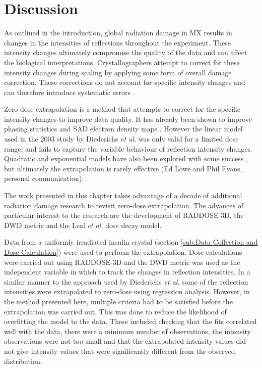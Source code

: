 \section{Discussion}
\label{sec:Discussion - Zero-dose extrapolation}
As outlined in the introduction, global radiation damage in MX results in changes in the intensities of reflections throughout the experiment.
These intensity changes ultimately compromise the quality of the data and can affect the biological interpretations.
Crystallographers attempt to correct for these intensity changes during scaling by applying some form of overall damage correction.
These corrections do not account for specific intensity changes and can therefore introduce systematic errors \cite{diederichs2003}.

Zero-dose extrapolation is a method that attempts to correct for the specific intensity changes to improve data quality.
It has already been shown to improve phasing statistics and SAD electron density maps \cite{diederichs2003}.
However the linear model used in the 2003 study by Diederichs \textit{et al.} was only valid for a limited dose range, and fails to capture the variable behaviour of reflection intensity changes.
Quadratic and exponential models have also been explored with some success \cite{diederichs2006}, but ultimately the extrapolation is rarely effective (Ed Lowe and Phil Evans, personal communication).

The work presented in this chapter takes advantage of a decade of additional radiation damage research to revisit zero-dose extrapolation.
The advances of particular interest to the research are the development of RADDOSE-3D, the DWD metric and the Leal \textit{et al.}  dose decay model.

Data from a uniformly irradiated insulin crystal (section \ref{sub:Data Collection and Dose Calculation}) were used to perform the extrapolation.
Dose calculations were carried out using RADDOSE-3D and the DWD metric was used as the independent variable in which to track the changes in reflection intensities.
In a similar manner to the approach used by Diederichs \textit{et al.} some of the reflection intensities were extrapolated to zero-dose using regression analysis.
However, in the method presented here, multiple criteria had to be satisfied before the extrapolation was carried out.
This was done to reduce the likelihood of overfitting the model to the data.
These included checking that the fits correlated well with the data, there were a minimum number of observations, the intensity observations were not too small and that the extrapolated intensity values did not give intensity values that were significantly different from the observed distribution.

